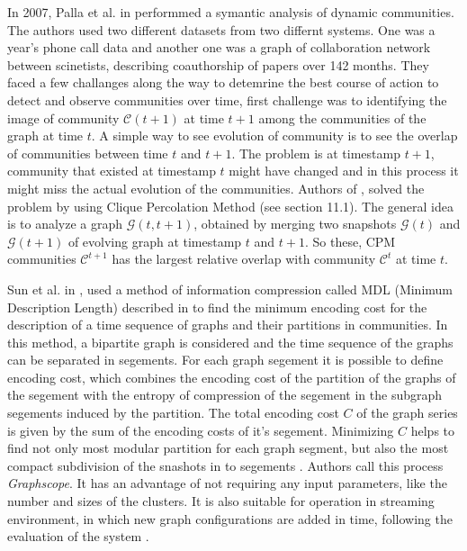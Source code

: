 {In 2007, Palla et al. in \cite{ref-23} performmed a symantic analysis of dynamic communities. The authors used two different datasets from two differnt systems. One was a year's phone call data and another one was a graph of collaboration network between scinetists, describing coauthorship of papers over 142 months. They faced a few challanges along the way to detemrine the best course of action to detect and observe communities over time, first challenge was to identifying the image of community $\mathcal{C}(t+1)$ at time $t+1$ among the communities of the graph at time $t$. A simple way to see evolution of community is to see the overlap of communities between time $t$ and $t+1$. The problem is at timestamp $t+1$, community that existed at timestamp $t$ might have changed and in this process it might miss the actual evolution of the communities. Authors of \cite{ref-23}, solved the problem by using Clique Percolation Method (see \cite{ref-6} section 11.1). The general idea is to analyze a graph $\mathcal{G}(t, t+1)$, obtained by merging two snapshots $\mathcal{G}(t)$ and $\mathcal{G}(t+1)$ of evolving graph at timestamp $t$ and $t+1$. So these, CPM communities {$\mathcal{C}^{t+1}$} has the largest relative overlap with community {$\mathcal{C}^t$} at time $t$.

Sun et al. in \cite{ref-53}, used a method of information compression called MDL (Minimum Description Length) described in \cite{ref-54} to find the minimum encoding cost for the description of a time sequence of graphs and their partitions in communities. In this method, a bipartite graph is considered and the time sequence of the graphs can be separated in segements. For each graph segement it is possible to define encoding cost, which combines the encoding cost of the partition of the graphs of the segement with the entropy of compression of the segement in the subgraph segements induced by the partition. The total encoding cost $C$ of the graph series is given by the sum of the encoding costs of it's segement. Minimizing $C$ helps to find not only most modular partition for each graph segment, but also the most compact subdivision of the snashots in to segements \cite{ref-54}. Authors call this process \textit{Graphscope}. It has an advantage of not requiring any input parameters, like the number and sizes of the clusters. It is also suitable for operation in streaming environment, in which new graph configurations are added in time, following the evaluation of the system \cite{ref-53}.

}
